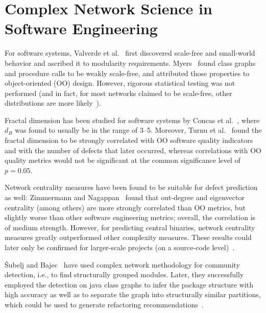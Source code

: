 \section{Complex Network Science in Software Engineering}\label{sec:related_software}

For software systems,
Valverde et al.~\cite{ScaleFreeSoftware2002Valverde} first discovered scale-free and small-world behavior and ascribed it to modularity requirements.
Myers~\cite{Networks2003Myers} found class graphs and procedure calls to be weakly scale-free,
and attributed those properties to object-oriented (OO) design.
However, rigorous statistical testing was not performed
(and in fact, for most networks claimed to be scale-free, other distributions are more likely~\cite{ScalefreeRare2019Broido}).

Fractal dimension has been studied for software systems by Concas et al.~\cite{FracDimSoftware2006Concas},
where $d_B$ was found to usually be in the range of \numrange{3}{5}.
Moreover, Turnu et al.~\cite{FractalDimension2013Turnu} found the fractal dimension to be strongly correlated with OO software quality indicators
and with the number of defects that later occurred,
whereas correlations with OO quality metrics would not be significant at the common significance level of $p = 0.05$.

Network centrality measures  have been found to be suitable for defect prediction as well:
Zimmermann and Nagappan~\cite{DefectsMetrics2008Zimmermann} found that out-degree and eigenvector centrality (among others) are more strongly correlated than OO metrics,
but slightly worse than other software engineering metrics;
overall, the correlation is of medium strength.
However, for predicting central binaries,
network centrality measures greatly outperformed other complexity measures.
These results could later only be confirmed for larger-scale projects (on a source-code level)~\cite{NetworkDefects2009Tosun}.

\v{S}ubelj and Bajec~\cite{CommunityDetect2011Subelj} have used complex network methodology for community detection,
i.e., to find structurally grouped modules.
Later, they successfully employed the detection on java class graphs to infer the package structure with high accuracy
as well as to separate the graph into structurally similar partitions,
which could be used to generate refactoring recommendations~\cite{Networks2012Subelj,Clustering2012Subelj}.